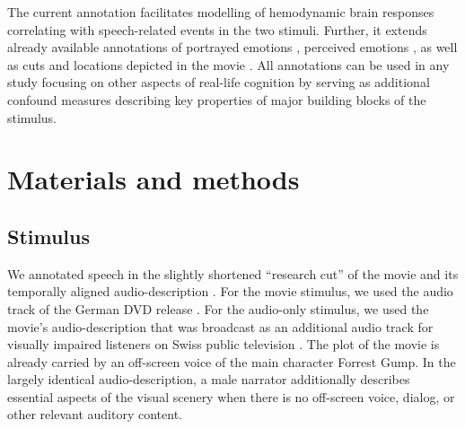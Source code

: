 \documentclass[10pt,a4paper,onecolumn]{article}
\begin{document}
The current annotation facilitates modelling of hemodynamic brain responses
correlating with speech-related events in the two stimuli. Further, it extends already available annotations of portrayed emotions \citep{labs2015portrayed}, perceived emotions \citep{lettieri2019emotionotopy}, as well as cuts and locations depicted in the movie \citep{haeusler2016annotation}. All annotations can be used in any study focusing on other aspects of real-life cognition by serving as additional confound measures describing key properties of major building blocks of the stimulus.

\section*{Materials and methods}
\subsection*{Stimulus}
We annotated speech in the slightly shortened ``research cut'' of the movie \citep{hanke2016simultaneous} and its temporally aligned audio-description \citep{hanke2014audiomovie}.
For the movie stimulus, we used the audio track of the German DVD release \citep{ForrestGumpDVD}.
For the audio-only stimulus, we used the movie's audio-description that was broadcast as an additional audio track for visually impaired listeners on Swiss public television \citep{ForrestGumpGermanAD}.
The plot of the movie is already carried by an off-screen voice of the main character Forrest Gump.
In the largely identical audio-description, a male narrator additionally describes essential aspects of the visual scenery when there is no off-screen voice, dialog, or other relevant auditory content.
\end{document}
